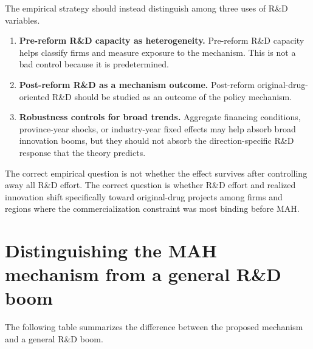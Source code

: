 \documentclass[12pt]{article}
\begin{document}
The empirical strategy should instead distinguish among three uses of R\&D variables.
\begin{enumerate}
    \item \textbf{Pre-reform R\&D capacity as heterogeneity.} Pre-reform R\&D capacity helps classify firms and measure exposure to the mechanism. This is not a bad control because it is predetermined.
    \item \textbf{Post-reform R\&D as a mechanism outcome.} Post-reform original-drug-oriented R\&D should be studied as an outcome of the policy mechanism.
    \item \textbf{Robustness controls for broad trends.} Aggregate financing conditions, province-year shocks, or industry-year fixed effects may help absorb broad innovation booms, but they should not absorb the direction-specific R\&D response that the theory predicts.
\end{enumerate}
The correct empirical question is not whether the effect survives after controlling away all R\&D effort. The correct question is whether R\&D effort and realized innovation shift specifically toward original-drug projects among firms and regions where the commercialization constraint was most binding before MAH.

\section{Distinguishing the MAH mechanism from a general R\&D boom}

The following table summarizes the difference between the proposed mechanism and a general R\&D boom.
\end{document}
